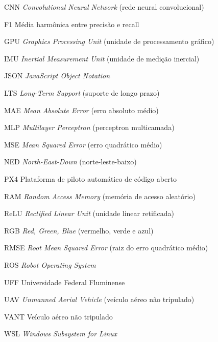\begin{siglas}
  \item[CNN] \textit{Convolutional Neural Network} (rede neural convolucional)
  \item[F1] Média harmônica entre precisão e recall
  \item[GPU] \textit{Graphics Processing Unit} (unidade de processamento gráfico)
  \item[IMU] \textit{Inertial Measurement Unit} (unidade de medição inercial)
  \item[JSON] \textit{JavaScript Object Notation}
  \item[LTS] \textit{Long-Term Support} (suporte de longo prazo)
  \item[MAE] \textit{Mean Absolute Error} (erro absoluto médio)
  \item[MLP] \textit{Multilayer Perceptron} (perceptron multicamada)
  \item[MSE] \textit{Mean Squared Error} (erro quadrático médio)
  \item[NED] \textit{North-East-Down} (norte-leste-baixo)
  \item[PX4] Plataforma de piloto automático de código aberto
  \item[RAM] \textit{Random Access Memory} (memória de acesso aleatório)
  \item[ReLU] \textit{Rectified Linear Unit} (unidade linear retificada)
  \item[RGB] \textit{Red, Green, Blue} (vermelho, verde e azul)
  \item[RMSE] \textit{Root Mean Squared Error} (raiz do erro quadrático médio)
  \item[ROS] \textit{Robot Operating System}
  \item[UFF] Universidade Federal Fluminense
  \item[UAV] \textit{Unmanned Aerial Vehicle} (veículo aéreo não tripulado)
  \item[VANT] Veículo aéreo não tripulado
  \item[WSL] \textit{Windows Subsystem for Linux}
\end{siglas}
